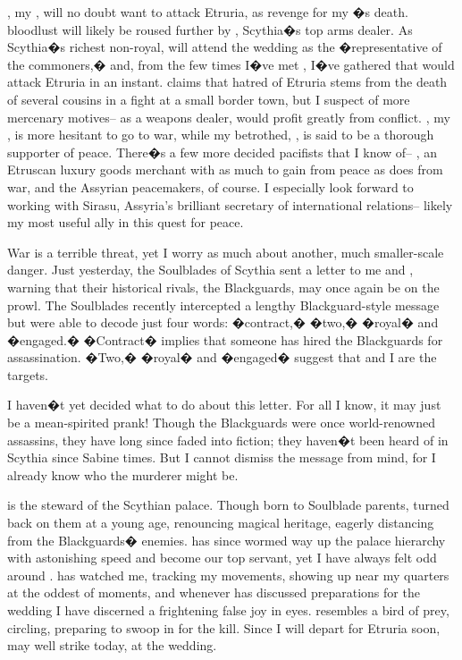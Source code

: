 \documentclass[char]{Kos}
\begin{document}
\cScythiaQueen{\nickname}, my \cScythiaQueen{\parent}, will no doubt want to attack Etruria, as revenge for my \cFugitive{\sibling}�s death. \cScythiaQueen{\Their} bloodlust will likely be roused further by \cArmsDealer{\name}, Scythia�s top arms dealer. As Scythia�s richest non-royal, \cArmsDealer{\nickname} will attend the wedding as the �representative of the commoners,� and, from the few times I�ve met \cArmsDealer{\them}, I�ve gathered that \cArmsDealer{\they} would attack Etruria in an instant. \cArmsDealer{\They} claims that \cArmsDealer{\their} hatred of Etruria stems from the death of several cousins in a fight at a small border town, but I suspect \cArmsDealer{\them} of more mercenary motives-- as a weapons dealer, \cArmsDealer{\nickname} would profit greatly from conflict. \cScythiaKing{\nickname}, my \cScythiaKing{\parent}, is more hesitant to go to war, while my betrothed, \cGroom{\them}, is said to be a thorough supporter of peace. There�s a few more decided pacifists that I know of-- \cMerchant{\name}, an Etruscan luxury goods merchant with as much to gain from peace as \cArmsDealer{\nickname} does from war, and the Assyrian peacemakers, of course. I especially look forward to working with Sirasu, Assyria's brilliant secretary of international relations-- likely my most useful ally in this quest for peace.

War is a terrible threat, yet I worry as much about another, much smaller-scale danger. Just yesterday, the Soulblades of Scythia sent a letter to me and \cGroom{\nickname}, warning that their historical rivals, the Blackguards, may once again be on the prowl. The Soulblades recently intercepted a lengthy Blackguard-style message but were able to decode just four words: �contract,� �two,� �royal� and �engaged.� �Contract� implies that someone has hired the Blackguards for assassination. �Two,� �royal� and �engaged� suggest that \cGroom{\nickname} and I are the targets.

I haven�t yet decided what to do about this letter. For all I know, it may just be a mean-spirited prank! Though the Blackguards were once world-renowned assassins, they have long since faded into fiction; they haven�t been heard of in Scythia since Sabine times. But I cannot dismiss the message from mind, for I already know who the murderer might be.

 is the steward of the Scythian palace. Though born to Soulblade parents,  turned  back on them at a young age, renouncing  magical heritage, eagerly distancing  from the Blackguards� enemies.  has since wormed  way up the palace hierarchy with astonishing speed and become our top servant, yet I have always felt odd around .  has watched me, tracking my movements, showing up near my quarters at the oddest of moments, and whenever  has discussed preparations for the wedding I have discerned a frightening false joy in  eyes.  resembles a bird of prey, circling, preparing to swoop in for the kill. Since I will depart for Etruria soon,  may well strike today, at the wedding.
\end{document}
